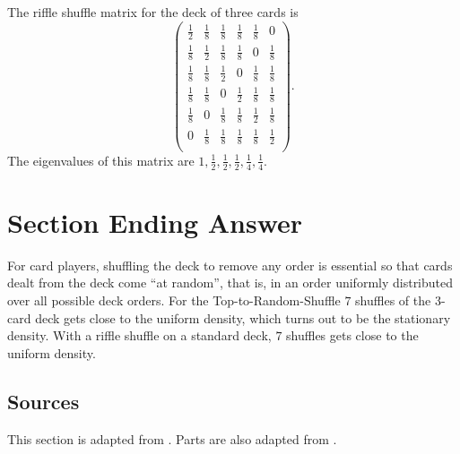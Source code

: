 \documentclass[12pt]{article}
\begin{document}
\begin{example}
    The riffle shuffle matrix for the deck of three cards is
    \[
        \begin{pmatrix}
            \frac{1}{2} & \frac{1}{8}   & \frac{1}{8}   & \frac{1}{8}
            & \frac{1}{8}       & 0 \\
            \frac{1}{8} & \frac{1}{2}   & \frac{1}{8}   & \frac{1}{8}
            & 0 & \frac{1}{8} \\
            \frac{1}{8} & \frac{1}{8}   & \frac{1}{2}   & 0     & \frac{1}
            {8} & \frac{1}{8} \\
            \frac{1}{8} & \frac{1}{8}   & 0     & \frac{1}{2}   & \frac{1}
            {8} & \frac{1}{8} \\
            \frac{1}{8} & 0     & \frac{1}{8}   & \frac{1}{8}   & \frac{1}
            {2} & \frac{1}{8} \\
            0   & \frac{1}{8}   & \frac{1}{8}   & \frac{1}{8}   & \frac{1}
            {8} & \frac{1}{2} \\
        \end{pmatrix}
        .
    \] The eigenvalues of this matrix are \( 1, \frac{1}{2}, \frac{1}{2},
    \frac{1}{2}, \frac{1}{4}, \frac{1}{4} \).
\end{example}

\section*{Section Ending Answer}

For card players, shuffling the deck to remove any order is essential so
that cards dealt from the deck come ``at random'', that is, in an order
uniformly distributed over all possible deck orders.  For the
Top-to-Random-Shuffle \( 7 \) shuffles of the 3-card deck gets close to
the uniform density, which turns out to be the stationary density.  With
a riffle shuffle on a standard deck, \( 7 \) shuffles gets close to the
uniform density.

\subsection*{Sources} This section is adapted from
\cite{mann94}. Parts are also adapted from
\cite{aldous86}.

\hr

\end{document}
